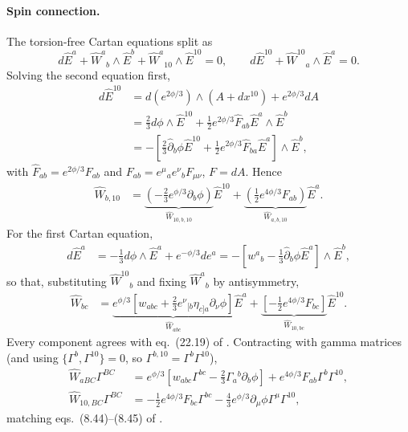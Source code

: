 \paragraph{Spin connection.}
The torsion-free Cartan equations split as
\begin{equation}
d\hat E^a+\hat W^a{}_b\wedge \hat E^b + \hat W^a{}_{10} \wedge \hat E^{10} = 0,\qquad
d\hat E^{10}+ \hat W^{10}{}_{a}\wedge \hat E^a = 0 .
\end{equation}
Solving the second equation first,
\begin{align}
d\hat E^{10}
&= d(e^{2\phi/3})\wedge (A+dx^{10}) + e^{2\phi/3}  dA\\
&=\tfrac{2}{3} d\phi\wedge \hat E^{10} + \tfrac{1}{2}e^{2\phi/3}  \hat F_{ab}  \hat E^a \wedge \hat E^b\\
&=-\left[
\tfrac{2}{3}\hat\partial_b\phi  \hat E^{10}+\tfrac{1}{2}e^{2\phi/3}\hat F_{ba}\hat E^a
\right]\wedge \hat E^b ,
\end{align}
with $\hat F_{ab}=e^{2\phi/3}F_{ab}$ and $F_{ab}=e^\mu{}_a e^\nu{}_b F_{\mu\nu}$, $F=dA$. Hence
\begin{align}
\hat W_{b,10}
&=
\underbrace{\left(-\tfrac{2}{3}e^{\phi/3}\partial_b\phi\right)}_{\hat W_{10,b,10}} \hat E^{10}
+ \underbrace{\left(\tfrac{1}{2}e^{4\phi/3}F_{ab}\right)}_{\hat W_{a,b,10}}\hat E^a .
\end{align}
For the first Cartan equation,
\begin{align}
d\hat E^a
&= -\tfrac{1}{3}d\phi \wedge \hat E^a+ e^{-\phi/3} de^a
=-\left[w^a{}_b-\tfrac{1}{3}\hat \partial_b\phi  \hat E^a\right]\wedge \hat E^b ,
\end{align}
so that, substituting $\hat W^{10}{}_b$ and fixing $\hat W^a{}_b$ by antisymmetry,
\begin{align}
\hat W_{bc}
&=\underbrace{e^{\phi/3}\left[w_{abc}+\tfrac{2}{3}e^\nu{}_{[b} \eta_{c]a}\partial_\nu \phi\right]}_{\hat W_{abc}} \hat E^a
+\underbrace{\left[-\tfrac{1}{2}e^{4\phi/3}F_{bc}\right]}_{\hat W_{10,bc}}\hat E^{10}.
\end{align}
Every component agrees with eq.~(22.19) of \cite{Ortin:2015hya}.
Contracting with gamma matrices (and using $\{\Gamma^b,\Gamma^{10}\}=0$, so $\Gamma^{b,10}=\Gamma^b\Gamma^{10}$),
\begin{align}
\hat W_{aBC}\Gamma^{BC}
&=e^{\phi/3}\left[w_{abc}\Gamma^{bc}-\tfrac{2}{3}\Gamma_a{}^{b}\partial_b\phi\right]
+e^{4\phi/3}F_{ab}\Gamma^{b}\Gamma^{10},\\
\hat W_{10,BC}\Gamma^{BC}
&=-\tfrac{1}{2}e^{4\phi/3}F_{bc}\Gamma^{bc}-\tfrac{4}{3}e^{\phi/3}\partial_\mu\phi  \Gamma^\mu \Gamma^{10},
\end{align}
matching eqs.~(8.44)--(8.45) of \cite{Becker:2006dvp}.

